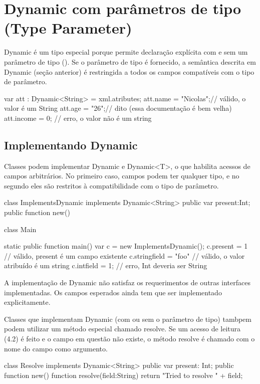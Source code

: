 {{{

\section{Dynamic com parâmetros de tipo (Type Parameter)}

Dynamic é um tipo especial porque permite declaração explícita com e sem um parâmetro de tipo (). Se o parâmetro de tipo é fornecido, a semântica descrita em Dynamic (seção anterior) é restringida a todos os campos compatíveis com o tipo de parâmetro.

var att : Dynamic<String> = xml.atributes;
att.name = "Nicolas";// válido, o valor é um String
att.age = "26";// dito (essa documentação é bem velha)
att.income = 0; // erro, o valor não é um string

\subsection{Implementando Dynamic}

Classes podem implementar Dynamic e Dynamic<T>, o que habilita acessos de campos arbitrários. No primeiro caso, campos podem ter qualquer tipo, e no segundo eles são restritos à compatibilidade com o tipo de parâmetro.

class ImplementsDynamic
   implements Dynamic<String> {
   public var present:Int;
   public function new() {}
}

class Main {
   static public function main() {
   var c = new ImplementsDynamic();
   c.present = 1 // válido, present é um campo existente
   c.stringfield = "foo" // válido, o valor atribuído é um string
   c.intfield = 1; // erro, Int deveria ser String
}

A implementação de Dynamic não satisfaz os requerimentos de outras interfaces implementadas. Os campos esperados ainda tem que ser implementado explicitamente.

Classes que implementam Dynamic (com ou sem o parâmetro de tipo) tambpem podem utilizar um método especial chamado resolve. Se um acesso de leitura (4.2) é feito e o campo em questão não existe, o método resolve é chamado com o nome do campo como argumento.

class Resolve implements Dynamic<String> {
    public var present: Int;
    public function new() {}
    function resolve(field:String){
       return "Tried to resolve " + field;
    }
}

}}}}
